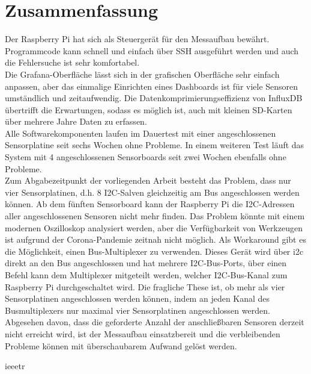 \documentclass[a4paper,oneside,12pt,titlepage]{scrartcl}   %
\begin{document}
\section{Zusammenfassung}
Der Raspberry Pi hat sich als Steuergerät für den Messaufbau bewährt.
Programmcode kann schnell und einfach über SSH ausgeführt werden und auch die Fehlersuche ist sehr komfortabel.\\
Die Grafana-Oberfläche lässt sich in der grafischen Oberfläche sehr einfach anpassen, aber das einmalige Einrichten eines Dashboards ist für viele Sensoren umständlich und zeitaufwendig.
Die Datenkomprimierungseffizienz von InfluxDB übertrifft die Erwartungen, sodass es möglich ist, auch mit kleinen SD-Karten über mehrere Jahre Daten zu erfassen.\\
Alle Softwarekomponenten laufen im Dauertest mit einer angeschlossenen Sensorplatine seit sechs Wochen ohne Probleme.
In einem weiteren Test läuft das System mit 4 angeschlossenen Sensorboards seit zwei Wochen ebenfalls ohne Probleme.\\
Zum Abgabezeitpunkt der vorliegenden Arbeit besteht das Problem, dass nur vier Sensorplatinen, d.h. 8 I2C-Salven gleichzeitig am Bus angeschlossen werden können.
Ab dem fünften Sensorboard kann der Raspberry Pi die I2C-Adressen aller angeschlossenen Sensoren nicht mehr finden.
Das Problem könnte mit einem modernen Oszilloskop analysiert werden, aber die Verfügbarkeit von Werkzeugen ist aufgrund der Corona-Pandemie zeitnah nicht möglich.
Als Workaround gibt es die Möglichkeit, einen Bus-Multiplexer zu verwenden.
Dieses Gerät wird über i2c direkt an den Bus angeschlossen und hat mehrere I2C-Bus-Ports, über einen Befehl kann dem Multiplexer mitgeteilt werden, welcher I2C-Bus-Kanal zum Raspberry Pi durchgeschaltet wird.
Die fragliche These ist, ob mehr als vier Sensorplatinen angeschlossen werden können, indem an jeden Kanal des Busmultiplexers nur maximal vier Sensorplatinen angeschlossen werden.\\
Abgesehen davon, dass die geforderte Anzahl der anschließbaren Sensoren derzeit nicht erreicht wird, ist der Messaufbau einsatzbereit und die verbleibenden Probleme können mit überschaubarem Aufwand gelöst werden.


 {ieeetr}
\end{document}
